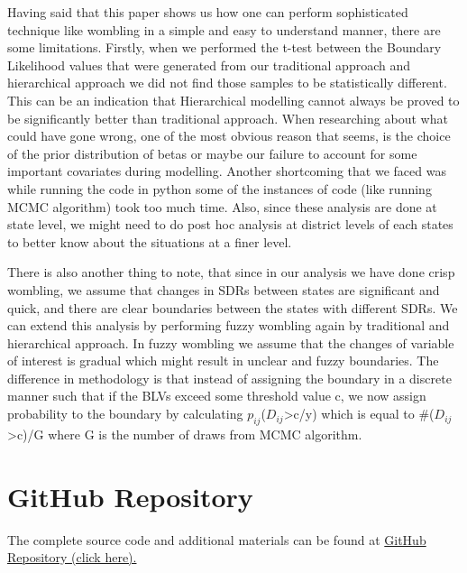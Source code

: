\documentclass[enabledeprecatedfontcommands,parskip=half,twoside=semi,BCOR=0mm]{scrreprt}
\numberwithin{equation}{chapter}
\theoremstyle{definition}
\theoremstyle{remark}
\begin{document}
    Having said that this paper shows us how one can perform sophisticated technique like wombling in a simple and easy to understand manner, there are some limitations. Firstly, when we performed the t-test between the Boundary Likelihood values that were generated from our traditional approach and hierarchical approach we did not find those samples to be statistically different. This can be an indication that Hierarchical modelling cannot always be proved to be significantly better than traditional approach. When researching about what could have gone wrong, one of the most obvious reason that seems, is the choice of the prior distribution of betas or maybe our failure to account for some important covariates during modelling. Another shortcoming that we faced was while running the code in python some of the instances of code (like running MCMC algorithm) took too much time. Also, since these analysis are done at state level, we might need to do post hoc analysis at district levels of each states to better know about the situations at a finer level. 
    
    There is also another thing to note, that since in our analysis we have done crisp wombling, we assume that changes in SDRs between states are significant and quick, and there are clear boundaries between the states with different SDRs. We can extend this analysis by performing fuzzy wombling again by traditional and hierarchical approach. In fuzzy wombling we assume that the changes of variable of interest is gradual which might result in unclear and fuzzy boundaries. The difference in methodology is that instead of assigning the boundary in a discrete manner such that if the BLVs exceed some threshold value c, we now assign probability to the boundary by calculating \(p_{ij}\)(\(D_{ij}\)>c/y) which is equal to \#(\(D_{ij}\)>c)/G where G is the number of draws from MCMC algorithm.

   \appendix
    \chapter{GitHub Repository}
    The complete source code and additional materials can be found at \href{https://github.com/SameerR007/ArealWombling_Project}{GitHub Repository (click here).}
    
    \newpage
    \printbibliography
\end{document}

